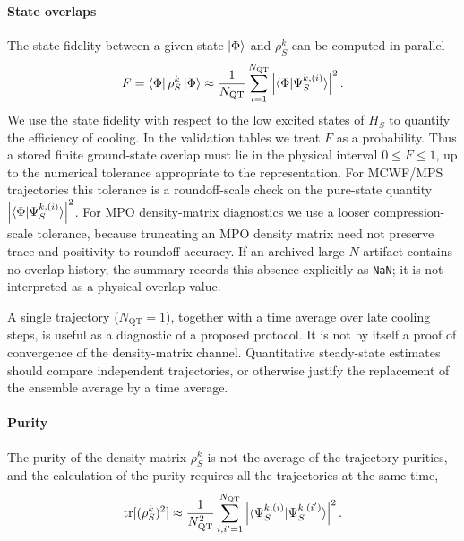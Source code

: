 \documentclass[aps,pra,twocolumn,superscriptaddress,nolongbibliography,nobalancelastpage,10pt]{revtex4-2}
\begin{document}
\paragraph{State overlaps}
The state fidelity between a given state $\ket{\Phi}$ and $\rho_S^k$ can be computed in parallel
\begin{equation}
	F = \bra{\Phi}\rho_S^k\ket{\Phi} \approx \frac{1}{N_\text{QT}}\sum_{i=1}^{N_\text{QT}} \left|\braket{\Phi|\Psi_S^{k,(i)}}\right|^2.
\end{equation}
We use the state fidelity with respect to the low excited states of $H_S$ to quantify the efficiency of cooling.
In the validation tables we treat \(F\) as a probability.  Thus a stored
finite ground-state overlap must lie in the physical interval \(0\leq F\leq
1\), up to the numerical tolerance appropriate to the representation.  For
MCWF/MPS trajectories this tolerance is a roundoff-scale check on the pure-state
quantity \(\left|\braket{\Phi|\Psi_S^{k,(i)}}\right|^2\).  For MPO
density-matrix diagnostics we use a looser compression-scale tolerance, because
truncating an MPO density matrix need not preserve trace and positivity to
roundoff accuracy.  If an archived large-\(N\) artifact contains no overlap
history, the summary records this absence explicitly as \texttt{NaN}; it is not
interpreted as a physical overlap value.


A single trajectory ($N_\text{QT}=1$), together with a time average over late cooling steps, is useful as a diagnostic of a proposed protocol. It is not by itself a proof of convergence of the density-matrix channel. Quantitative steady-state estimates should compare independent trajectories, or otherwise justify the replacement of the ensemble average by a time average.


\paragraph{Purity}
The purity of the density matrix $\rho_S^k$ is not the average of the trajectory purities, and the calculation of the purity requires all the trajectories at the same time,
\begin{equation}
	\operatorname{tr}[(\rho_S^k)^2] \approx \frac{1}{N_\text{QT}^2} \sum_{i,i'=1}^{N_\text{QT}} \left|\braket{\Psi_S^{k,(i)}|\Psi_S^{k,(i')}}\right|^2.
\end{equation}
\end{document}
